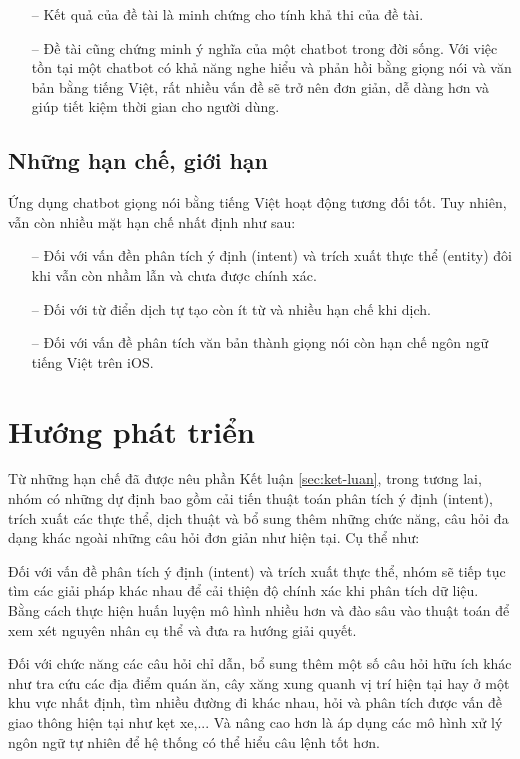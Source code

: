 \begin{itemize}
    \item[--] Kết quả của đề tài là minh chứng cho tính khả thi của đề tài.
    \item[--] Đề tài cũng chứng minh ý nghĩa của một chatbot trong đời sống. Với việc tồn tại một chatbot có khả năng nghe hiểu và phản hồi bằng giọng nói và văn bản bằng tiếng Việt, rất nhiều vấn đề sẽ trở nên đơn giản, dễ dàng hơn và giúp tiết kiệm thời gian cho người dùng.
\end{itemize}

\subsection{Những hạn chế, giới hạn}
Ứng dụng chatbot giọng nói bằng tiếng Việt hoạt động tương đối tốt. Tuy nhiên, vẫn còn nhiều mặt hạn chế nhất định như sau:
\begin{itemize}
    \item[--] Đối với vấn đền phân tích ý định (intent) và trích xuất thực thể (entity) đôi khi vẫn còn nhầm lẫn và chưa được chính xác.
    \item[--] Đối với từ điển dịch tự tạo còn ít từ và nhiều hạn chế khi dịch.
    \item[--] Đối với vấn đề phân tích văn bản thành giọng nói còn hạn chế ngôn ngữ tiếng Việt trên iOS.
\end{itemize}

\section{Hướng phát triển}


Từ những hạn chế đã được nêu phần Kết luận \ref{sec:ket-luan}, trong tương lai, nhóm có những dự định bao gồm cải tiến thuật toán phân tích ý định (intent), trích xuất các thực thể, dịch thuật và bổ sung thêm những chức năng, câu hỏi đa dạng khác ngoài những câu hỏi đơn giản như hiện tại. Cụ thể như:

Đối với vấn đề phân tích ý định (intent) và trích xuất thực thể, nhóm sẽ tiếp tục tìm các giải pháp khác nhau để cải thiện độ chính xác khi phân tích dữ liệu. Bằng cách thực hiện huấn luyện mô hình nhiều hơn và đào sâu vào thuật toán để xem xét nguyên nhân cụ thể và đưa ra hướng giải quyết.

Đối với chức năng các câu hỏi chỉ dẫn, bổ sung thêm một số câu hỏi hữu ích khác như tra cứu các địa điểm quán ăn, cây xăng xung quanh vị trí hiện tại hay ở một khu vực nhất định, tìm nhiều đường đi khác nhau, hỏi và phân tích được vấn đề giao thông hiện tại như kẹt xe,... Và nâng cao hơn là áp dụng các mô hình xử lý ngôn ngữ tự nhiên để hệ thống có thể hiểu câu lệnh tốt hơn.